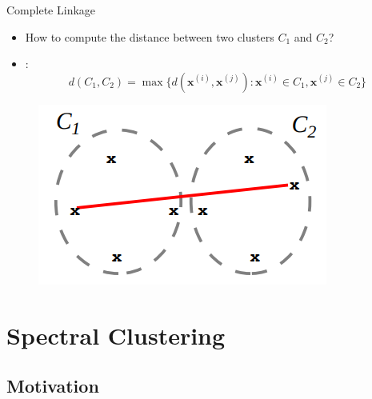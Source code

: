 \begin{frame}{Complete Linkage}{}
	\begin{itemize}
		\item How to compute the distance between two clusters $C_1$ and $C_2$?
		\item {}:
		\begin{equation*}
			d(C_1, C_2) = \max\{ d(\bm{x}^{(i)}, \bm{x}^{(j)}) : \bm{x}^{(i)} \in C_1, \bm{x}^{(j)} \in C_2 \}
		\end{equation*}
	\end{itemize}

	\begin{figure}
		\centering
		\includegraphics[scale=0.4]{12_clustering/02_img/complete_linkage}
	\end{figure}
\end{frame}


\section{Spectral Clustering}

\subsection{Motivation}

